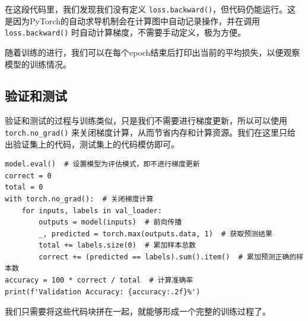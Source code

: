 在这段代码里，我们发现我们没有定义 \texttt{loss.backward()}，但代码仍能运行。这是因为PyTorch的自动求导机制会在计算图中自动记录操作，并在调用 \texttt{loss.backward()} 时自动计算梯度，不需要手动定义，极为方便。

随着训练的进行，我们可以在每个epoch结束后打印出当前的平均损失，以便观察模型的训练情况。

\subsection{验证和测试}

验证和测试的过程与训练类似，只是我们不需要进行梯度更新，所以可以使用 \texttt{torch.no_grad()} 来关闭梯度计算，从而节省内存和计算资源。我们在这里只给出验证集上的代码，测试集上的代码模仿即可。
\begin{verbatim}
model.eval()  # 设置模型为评估模式，即不进行梯度更新
correct = 0
total = 0
with torch.no_grad():  # 关闭梯度计算
    for inputs, labels in val_loader:
        outputs = model(inputs)  # 前向传播
        _, predicted = torch.max(outputs.data, 1)  # 获取预测结果
        total += labels.size(0)  # 累加样本总数
        correct += (predicted == labels).sum().item()  # 累加预测正确的样本数
accuracy = 100 * correct / total  # 计算准确率
print(f'Validation Accuracy: {accuracy:.2f}%')
\end{verbatim}

我们只需要将这些代码块拼在一起，就能够形成一个完整的训练过程了。